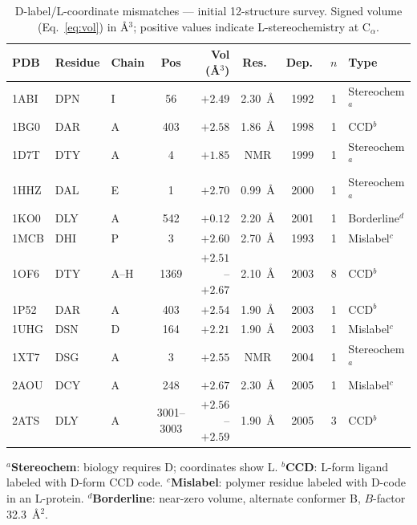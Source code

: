 \documentclass[11pt]{article}
\begin{document}
\begin{table}[H]
\centering
\caption{D-label/L-coordinate mismatches --- initial 12-structure survey.
Signed volume (Eq.~\ref{eq:vol}) in \AA$^3$; positive values indicate
L-stereochemistry at C$_\alpha$.}
\label{tab:errors1}
\small
\begin{tabular}{lllcrcccl}
\toprule
PDB & Residue & Chain & Pos & Vol (\AA$^3$) & Res.\ & Dep.\ & $n$ & Type \\
\midrule
1ABI & DPN & I & 56  & $+2.49$ & 2.30~\AA & 1992 & 1 & Stereochem$^a$ \\
1BG0 & DAR & A & 403 & $+2.58$ & 1.86~\AA & 1998 & 1 & CCD$^b$ \\
1D7T & DTY & A &   4 & $+1.85$ & NMR      & 1999 & 1 & Stereochem$^a$ \\
1HHZ & DAL & E &   1 & $+2.70$ & 0.99~\AA & 2000 & 1 & Stereochem$^a$ \\
1KO0 & DLY & A & 542 & $+0.12$ & 2.20~\AA & 2001 & 1 & Borderline$^d$ \\
1MCB & DHI & P &   3 & $+2.60$ & 2.70~\AA & 1993 & 1 & Mislabel$^c$ \\
1OF6 & DTY & A--H & 1369 & $+2.51$--$+2.67$ & 2.10~\AA & 2003 & 8 & CCD$^b$ \\
1P52 & DAR & A & 403 & $+2.54$ & 1.90~\AA & 2003 & 1 & CCD$^b$ \\
1UHG & DSN & D & 164 & $+2.21$ & 1.90~\AA & 2003 & 1 & Mislabel$^c$ \\
1XT7 & DSG & A &   3 & $+2.55$ & NMR      & 2004 & 1 & Stereochem$^a$ \\
2AOU & DCY & A & 248 & $+2.67$ & 2.30~\AA & 2005 & 1 & Mislabel$^c$ \\
2ATS & DLY & A & 3001--3003 & $+2.56$--$+2.59$ & 1.90~\AA & 2005 & 3 & CCD$^b$ \\
\bottomrule
\end{tabular}

\smallskip
\noindent\footnotesize
$^a$\textbf{Stereochem}: biology requires D; coordinates show L.
$^b$\textbf{CCD}: L-form ligand labeled with D-form CCD code.
$^c$\textbf{Mislabel}: polymer residue labeled with D-code in an L-protein.
$^d$\textbf{Borderline}: near-zero volume, alternate conformer B,
$B$-factor 32.3~\AA$^2$.
\end{table}
\end{document}
